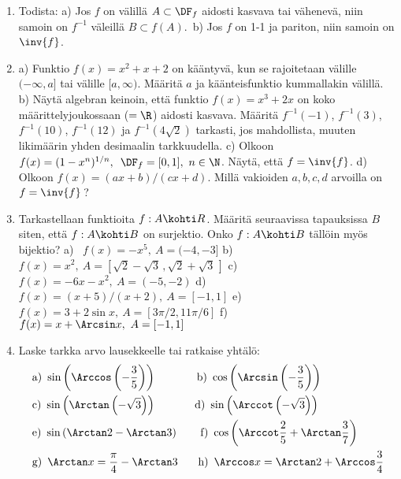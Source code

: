 \Harj
\begin{enumerate}

\item \label{H-IV-2: todistus}
Todista: a) Jos $f$ on välillä $A\subset\DF_f$ aidosti kasvava tai vähenevä, niin samoin
on $f^{-1}$ väleillä $B \subset f(A)$.\, b) Jos $f$ on 1-1 ja pariton, niin samoin on
$\inv{f}$.

\item
a) Funktio $f(x)=x^2+x+2$ on kääntyvä, kun se rajoitetaan välille $(-\infty,a]$ tai välille
$[a,\infty)$. Määritä $a$ ja käänteisfunktio kummallakin välillä. \vspace{1mm}\newline
b) Näytä algebran keinoin, että funktio $f(x)=x^3+2x$ on koko määrittelyjoukossaan ($=\R$)
aidosti kasvava. Määritä $f^{-1}(-1)$, $f^{-1}(3)$, $f^{-1}(10)$, $f^{-1}(12)$ ja 
$f^{-1}(4\sqrt{2})$ tarkasti, jos mahdollista, muuten likimäärin yhden desimaalin
tarkkuudella. \vspace{1mm}\newline
c) Olkoon $f(x)=(1-x^n)^{1/n},\,\ \DF_f=[0,1],\ n\in\N$. Näytä, että $f=\inv{f}$.
\vspace{1mm}\newline
d) Olkoon $f(x)=(ax+b)/(cx+d)$. Millä vakioiden $a,b,c,d$ arvoilla on $f=\inv{f}$\,?

\item
Tarkastellaan funktioita $f: A \kohti R$. Määritä seuraavissa tapauksissa $B$ siten, että
$f: A \kohti B$ on surjektio. Onko $f: A \kohti B$ tällöin myös bijektio? \vspace{1mm}\newline
a) \ $f(x)=-x^5,\ A=(-4,-3]$ \newline
b) \ $f(x)=x^2,\ A=[\sqrt{2}-\sqrt{3}\,,\sqrt{2}+\sqrt{3}\,]$ \newline
c) \ $f(x)=-6x-x^2,\ A=(-5,-2)$ \newline
d) \ $f(x)=(x+5)/(x+2),\ A=[-1,1]$ \newline
e) \ $f(x)=3+2\sin x,\ A=[3\pi/2,11\pi/6]$ \newline
f) \ $f(x)=x+\Arcsin x,\ A=[-1,1]$

\item
Laske tarkka arvo lausekkeelle tai ratkaise yhtälö:
\begin{align*}
&\text{a)}\ \sin\left(\Arccos\left(-\frac{3}{5}\right)\right) \qquad\quad\ \
 \text{b)}\ \cos\left(\Arcsin\left(-\frac{3}{5}\right)\right) \\
&\text{c)}\ \sin\left(\Arctan\left(-\sqrt{3}\right)\right) \qquad\quad\,\
 \text{d)}\ \sin\left(\Arccot\left(-\sqrt{3}\right)\right) \\
&\text{e)}\ \sin\left(\Arctan 2-\Arctan 3\right) \quad\ \ \
 \text{f)}\ \cos\left(\Arccot\frac{2}{5}+\Arctan\frac{3}{7}\right) \\
&\text{g)} \,\ \Arctan x=\frac{\pi}{4}-\Arctan 3 \quad\,\ \
 \text{h)} \,\ \Arccos x=\Arctan 2+\Arccos\frac{3}{4}
\end{align*}


\end{enumerate}
